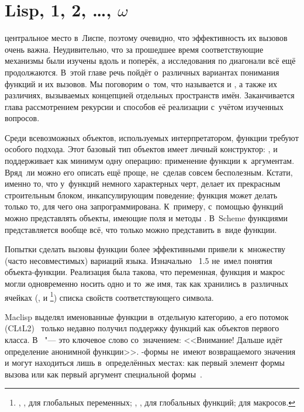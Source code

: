 \chapter{\texorpdfstring{Lisp, 1, 2, \dots, $\omega$}{Lisp, 1, 2, ..., ω}}%
\label{chapter:lisp1-2-omega}

 центральное место
в~Лиспе, поэтому очевидно, что эффективность их вызовов очень важна.
Неудивительно, что за прошедшее время соответствующие механизмы были изучены
вдоль и поперёк, а исследования по диагонали всё ещё продолжаются. В~этой главе
речь пойдёт о~различных вариантах понимания функций и их вызовов. Мы поговорим
о~том, что называется  и , а также их различиях, вызываемых
концепцией отдельных пространств имён. Заканчивается глава рассмотрением
рекурсии и способов её реализации с~учётом изученных вопросов.

\bigskip

Среди всевозможных объектов, используемых интерпретатором, функции требуют
особого подхода. Этот базовый тип объектов имеет личный конструктор:
, и поддерживает как минимум одну операцию: применение функции
к~аргументам. Вряд~ли можно его описать ещё проще, не~сделав совсем бесполезным.
Кстати, именно то, что у~функций немного характерных черт, делает их прекрасным
строительным блоком, инкапсулирующим поведение; функция может делать только то,
для чего она запрограммирована. К~примеру, с~помощью функций можно представлять
объекты, имеющие поля и методы \cite{ar88}. В~Scheme функциями представляется
вообще всё, что только можно представить в~виде функции.

Попытки сделать вызовы функции более эффективными привели к~множеству (часто
несовместимых) вариаций языка. Изначально \LISP~1.5 \cite{mae+62} не~имел
понятия объекта-функции. Реализация была такова, что переменная, функция и
макрос могли одновременно носить одно и то~же имя, так как хранились в~различных
ячейках (,  и \footnote{,
, для глобальных переменных; ,
, для глобальных функций;  для макросов.}) списка
свойств соответствующего символа.

Maclisp выделял именованные функции в~отдельную категорию, а его потомок
{\CommonLisp} (CLtL2)~\cite{ste90} только недавно получил поддержку функций как
объектов первого класса. В~{\CommonLisp}  "--- это ключевое слово
со~значением: <<Внимание! Дальше идёт определение анонимной функции>>.
-формы не~имеют возвращаемого значения и могут находиться лишь
в~определённых местах: как первый элемент формы вызова или как первый аргумент
специальной формы~.

